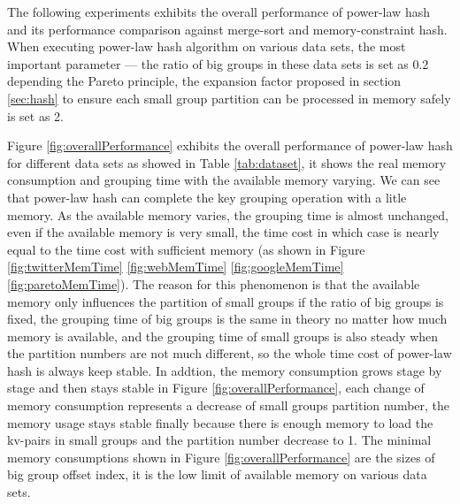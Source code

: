 The following experiments exhibits the overall performance of power-law hash and its performance comparison against merge-sort and memory-constraint hash. When executing power-law hash algorithm on various data sets, the most important parameter --- the ratio of big groups in these data sets is set as 0.2 depending the Pareto principle, the expansion factor proposed in section \ref{sec:hash} to ensure each small group partition can be processed in memory safely is set as 2. 

Figure \ref{fig:overallPerformance} exhibits the overall performance of power-law hash for different data sets as showed in Table \ref{tab:dataset}, it shows the real memory consumption and grouping time with the available memory varying. We can see that power-law hash can complete the key grouping operation with a litle memory. As the available memory varies, the grouping time is almost unchanged, even if the available memory is very small, the time cost in which case is nearly equal to the time cost with sufficient memory (as shown in Figure \ref{fig:twitterMemTime} \ref{fig:webMemTime} \ref{fig:googleMemTime} \ref{fig:paretoMemTime}). The reason for this phenomenon is that the available memory only influences the partition of small groups if the ratio of big groups is fixed, the grouping time of big groups is the same in theory no matter how much memory is available, and the grouping time of small groups is also steady when the partition numbers are not much different, so the whole time cost of power-law hash is always keep stable. In addtion, the memory consumption grows stage by stage and then stays stable in Figure \ref{fig:overallPerformance}, each change of memory consumption represents a decrease of small groups partition number, the memory usage stays stable finally because there is enough memory to load the kv-pairs in small groups and the partition number decrease to 1. The minimal memory consumptions shown in Figure \ref{fig:overallPerformance} are the sizes of big group offset index, it is the low limit of available memory on various data sets.   

